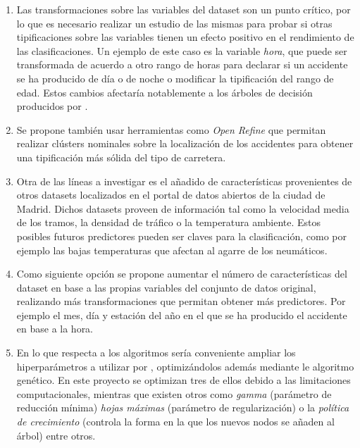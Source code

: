 	\begin{enumerate}


		\item Las transformaciones sobre las variables del dataset son un punto crítico, por lo que es necesario realizar un estudio de las mismas para probar si otras tipificaciones sobre las variables tienen un efecto positivo en el rendimiento de las clasificaciones. Un ejemplo de este caso es la variable \textit{hora}, que puede ser transformada de acuerdo a otro rango de horas para declarar si un accidente se ha producido de día o de noche o modificar la tipificación del rango de edad. Estos cambios afectaría notablemente a los árboles de decisión producidos por .

		\item Se propone también usar herramientas como \textit{Open Refine} \cite{OpenRefine} que permitan realizar clústers nominales sobre la localización de los accidentes para obtener una tipificación más sólida del tipo de carretera.

		\item Otra de las líneas a investigar es el añadido de características provenientes de otros datasets localizados en el portal de datos abiertos de la ciudad de Madrid. Dichos datasets proveen de información tal como la velocidad media de los tramos, la densidad de tráfico o la temperatura ambiente. Estos posibles futuros predictores pueden ser claves para la clasificación, como por ejemplo las bajas temperaturas que afectan al agarre de los neumáticos.

		\item Como siguiente opción se propone aumentar el número de características del dataset en base a las propias variables del conjunto de datos original, realizando más transformaciones que permitan obtener más predictores. Por ejemplo el mes, día y estación del año en el que se ha producido el accidente en base a la hora.

		\item En lo que respecta a los algoritmos sería conveniente ampliar los hiperparámetros a utilizar por , optimizándolos además mediante le algoritmo genético. En este proyecto se optimizan tres de ellos debido a las limitaciones computacionales, mientras que existen otros como \textit{gamma} (parámetro de reducción mínima) \textit{hojas máximas} (parámetro de regularización) o la \textit{política de crecimiento} (controla la forma en la que los nuevos nodos se añaden al árbol) entre otros.


\end{enumerate}
